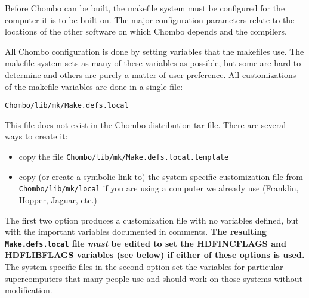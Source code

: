 Before Chombo can be built, the makefile system must be configured for the
computer it is to be built on.  The major configuration parameters relate to
the locations of the other software on which Chombo depends and the
compilers.  

All Chombo configuration is done by setting variables that the makefiles use.
The makefile system sets as many of these variables as possible, but some are
hard to determine and others are purely a matter of user preference.  All
customizations of the makefile variables are done in a single file:
\begin{verbatim}
Chombo/lib/mk/Make.defs.local
\end{verbatim}

This file does not exist in the Chombo distribution tar file.  There are several ways to 
create it:
\begin{itemize}
\item copy the file {\tt Chombo/lib/mk/Make.defs.local.template}
\item copy (or create a symbolic link to) the system-specific
  customization file from {\tt Chombo/lib/mk/local} if you are using a
  computer we already use (Franklin, Hopper, Jaguar, etc.)  
\end{itemize}

The first two option produces a customization file with no variables
defined, but with the important variables documented in comments.  {\bf The
resulting {\tt Make.defs.local} file {\em must} be edited to set the
HDFINCFLAGS and HDFLIBFLAGS variables (see below) if either of these options
is used.}  The system-specific files in the second option set the variables
for particular supercomputers that many people use and should work on those
systems without modification.

